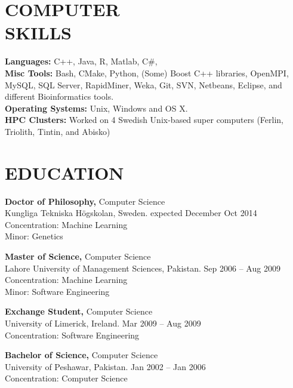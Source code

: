 \documentclass[margin, 10pt]{res} %
\begin{document}
\begin{resume}

\section{COMPUTER \\ SKILLS} 

{\bf Languages:} 
C++, Java, R, Matlab, C\#,  \\
{\bf Misc Tools:} Bash, CMake, Python, (Some) Boost C++ libraries, OpenMPI, MySQL, SQL Server, RapidMiner, Weka, Git, SVN, Netbeans, Eclipse, and different Bioinformatics tools. \\
{\bf Operating Systems:} Unix, Windows and OS X.  \\
{\bf HPC Clusters:} Worked on 4 Swedish Unix-based super computers (Ferlin, Triolith, Tintin, and Abisko)


\section{EDUCATION}

{\bf Doctor of Philosophy,} Computer Science \\
Kungliga Tekniska Högskolan, Sweden. expected December Oct 2014 \\
Concentration: Machine Learning \\
Minor: Genetics 

{\bf Master of Science,} Computer Science \\
Lahore University of Management Sciences, Pakistan. Sep 2006 -- Aug 2009 \\
Concentration: Machine Learning \\
Minor: Software Engineering

{\bf Exchange Student,} Computer Science \\
University of Limerick, Ireland. Mar 2009 -- Aug 2009 \\
Concentration: Software Engineering 

{\bf Bachelor of Science,} Computer Science \\
University of Peshawar, Pakistan. Jan 2002 -- Jan 2006 \\
Concentration: Computer Science 


\end{resume}
\end{document}
